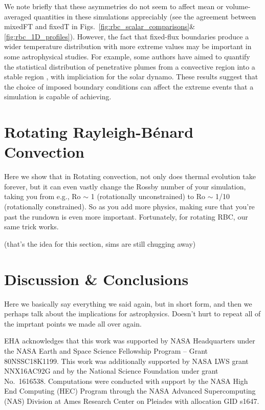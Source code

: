 \documentclass[aps, pre, onecolumn, nofootinbib, notitlepage, groupedaddress, amsfonts, amssymb, amsmath, longbibliography]{revtex4-1}
\newcommand{\RB}{Rayleigh-B\'{e}nard }
\begin{document}
We note briefly that these asymmetries do not seem to affect mean or volume-averaged quantities in these simulations appreciably (see the agreement between mixedFT and fixedT in Figs.~\ref{fig:rbc_scalar_comparisons}\&\ref{fig:rbc_1D_profiles}).
However, the fact that fixed-flux boundaries produce a wider temperature distribution with more extreme values may be important in some astrophysical studies.
For example, some authors have aimed to quantify the statistical distribution of penetrative plumes from a convective region into a stable region \cite{pratt&all2017}, with impliciation for the solar dynamo.
These results suggest that the choice of imposed boundary conditions can affect the extreme events that a simulation is capable of achieving.





\section{Rotating \RB Convection}
\label{sec:rotating_results}
Here we show that in Rotating convection, not only does thermal evolution take forever, but it can even vastly change the Rossby number of your simulation, taking you from e.g., Ro $\sim$ 1 (rotationally unconstrained) to Ro $\sim$ 1/10 (rotationally constrained).
So as you add more physics, making sure that you're past the rundown is even more important.
Fortunately, for rotating RBC, our same trick works.

(that's the idea for this section, sims are still chugging away)



\section{Discussion \& Conclusions}
\label{sec:discussion}

Here we basically say everything we said again, but in short form, and then we perhaps talk about the implications for astrophysics.
Doesn't hurt to repeat all of the imprtant points we made all over again.


\begin{acknowledgments}
EHA acknowledges that this work was supported by NASA Headquarters under the NASA Earth and Space Science Fellowship Program -- Grant 80NSSC18K1199.
This work was additionally supported by NASA LWS grant NNX16AC92G and by the National Science Foundation under grant No.~1616538. 
Computations were conducted with support by the NASA High End Computing (HEC) Program through the NASA  Advanced Supercomputing (NAS) Division at Ames Research Center on Pleiades with allocation GID s1647.
\end{acknowledgments}
\end{document}
